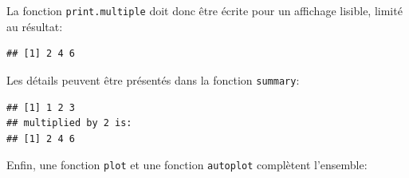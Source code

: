 \documentclass[
  11pt,
  french,
  a4paper,
  extrafontsizes,onecolumn,openright
  ]{memoir}
\newenvironment{Shaded}{\begin{snugshade}}{\end{snugshade}}
\newcommand{\CommentTok}[1]{\textcolor[rgb]{0.56,0.35,0.01}{\textit{#1}}}
\newcommand{\ControlFlowTok}[1]{\textcolor[rgb]{0.13,0.29,0.53}{\textbf{#1}}}
\newcommand{\FunctionTok}[1]{\textcolor[rgb]{0.00,0.00,0.00}{#1}}
\newcommand{\NormalTok}[1]{#1}
\newcommand{\OtherTok}[1]{\textcolor[rgb]{0.56,0.35,0.01}{#1}}
\newcommand{\SpecialCharTok}[1]{\textcolor[rgb]{0.00,0.00,0.00}{#1}}
\newcommand{\StringTok}[1]{\textcolor[rgb]{0.31,0.60,0.02}{#1}}
\begin{document}
\normalsize

La fonction \texttt{print.multiple} doit donc être écrite pour un affichage lisible, limité au résultat:

\scriptsize

\begin{Shaded}
\end{Shaded}

\begin{verbatim}
## [1] 2 4 6
\end{verbatim}

\normalsize

Les détails peuvent être présentés dans la fonction \texttt{summary}:

\scriptsize

\begin{Shaded}
\end{Shaded}

\begin{verbatim}
## [1] 1 2 3
## multiplied by 2 is:
## [1] 2 4 6
\end{verbatim}

\normalsize

Enfin, une fonction \texttt{plot} et une fonction \texttt{autoplot} complètent l'ensemble:

\scriptsize
\end{document}
